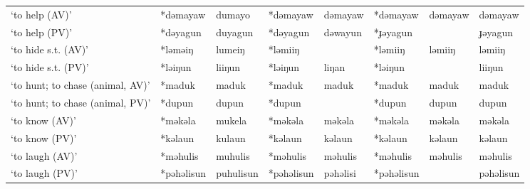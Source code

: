 \begin{landscape}
\begin{longtable}[c]{@{}p{3cm}<{\raggedright}p{2.75cm}<{\raggedright}p{2.75cm}<{\raggedright}p{2.75cm}<{\raggedright}p{2.75cm}<{\raggedright}p{2.75cm}<{\raggedright}p{2.75cm}<{\raggedright}p{2.75cm}<{\raggedright}@{}}
`to help (AV)'                                       & *dəmayaw           & dumayo                         & *dəmayaw           & dəmayaw                    & *dəmayaw         & dəmayaw                  & dəmayaw                           \\
`to help (PV)'                                       & *dəyagun           & duyagun                        & *dəyagun           & dəwayun                    & *ɟəyagun         &                          & ɟəyagun                           \\
`to hide s.t. (AV)'                                  & *ləməiŋ            & lumeiŋ                         & *ləmiiŋ            &                            & *ləmiiŋ          & ləmiiŋ                   & ləmiiŋ                            \\
`to hide s.t. (PV)'                                  & *ləiŋun            & liiŋun                         & *ləiŋun            & liŋan                      & *ləiŋun          &                          & liiŋun                            \\
`to hunt; to chase (animal, AV)'                     & *maduk             & maduk                          & *maduk             & maduk                      & *maduk           & maduk                    & maduk                             \\
`to hunt; to chase (animal, PV)'                     & *dupun             & dupun                          & *dupun             &                            & *dupun           & dupun                    & dupun                             \\
`to know (AV)'                                       & *məkəla            & mukela                         & *məkəla            & məkəla                     & *məkəla          & məkəla                   & məkəla                            \\
`to know (PV)'                                       & *kəlaun            & kulaun                         & *kəlaun            & kəlaun                     & *kəlaun          & kəlaun                   & kəlaun                            \\
`to laugh (AV)'                                      & *məhulis           & muhulis                        & *məhulis           & məhulis                    & *məhulis         & məhulis                  & məhulis                           \\
`to laugh (PV)'                                      & *pəhəlisun         & puhulisun                      & *pəhəlisun         & pəhəlisi                   & *pəhəlisun       &                          & pəhəlisun                         \\

\end{longtable}
\end{landscape}
